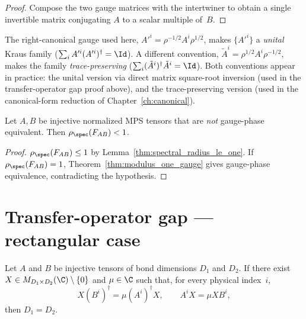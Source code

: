 \begin{proof}\leanok
    Compose the two gauge matrices with the intertwiner to obtain a
    single invertible matrix conjugating $A$ to a scalar multiple of~$B$.
\end{proof}

\begin{remark}\label{rem:gauge_conventions}\leanok
    The right-canonical gauge used here, $A'^i = \rho^{-1/2} A^i \rho^{1/2}$,
    makes $\{A'^i\}$ a \emph{unital} Kraus family ($\sum_i A'^i (A'^i)^\dagger = \Id$).
    A different convention, $\tilde{A}^i = \rho^{1/2} A^i \rho^{-1/2}$, makes
    the family \emph{trace-preserving} ($\sum_i (\tilde{A}^i)^\dagger \tilde{A}^i = \Id$).
    Both conventions appear in practice:
    the unital version via direct matrix square-root inversion
    (used in the transfer-operator gap proof above), and the trace-preserving
    version (used in the canonical-form reduction of
    Chapter~\ref{ch:canonical}).
\end{remark}

\begin{theorem}\label{thm:transfer_operator_gap}
    \leanok
    Let $A, B$ be injective normalized MPS tensors that
    are \emph{not} gauge-phase equivalent.
    Then $\rho_{\spec}(F_{AB}) < 1$.
\end{theorem}

\begin{proof}\leanok{}
    $\rho_{\spec}(F_{AB}) \le 1$ by
    Lemma~\ref{thm:spectral_radius_le_one}.
    If $\rho_{\spec}(F_{AB}) = 1$,
    Theorem~\ref{thm:modulus_one_gauge} gives gauge-phase
    equivalence, contradicting the hypothesis.
\end{proof}

\section{Transfer-operator gap --- rectangular case}

\begin{lemma}%
    \label{thm:rectangular_intertwining_dim_eq}
    \leanok
    Let $A$ and $B$ be injective tensors of bond dimensions $D_1$ and $D_2$.
    If there exist $X \in M_{D_1 \times D_2}(\C) \setminus \{0\}$ and
    $\mu \in \C$ such that, for every physical index~$i$,
    \[
        X (B^i)^\dagger = \mu (A^i)^\dagger X,
        \qquad
        A^i X = \mu X B^i,
    \]
    then $D_1 = D_2$.
\end{lemma}

